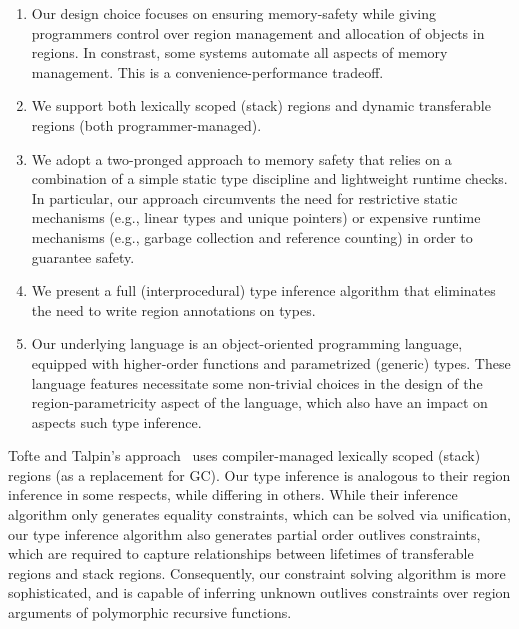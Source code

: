 \begin{enumerate}
\item 
   Our design choice focuses on ensuring memory-safety while giving programmers
   control over  region management and allocation of objects in regions.
   In constrast, some systems automate all aspects of memory management.
   This is a convenience-performance tradeoff.

\item We support both lexically scoped (stack) regions and dynamic transferable
regions (both programmer-managed).

\item We adopt a two-pronged approach to memory safety that relies on a
combination of a simple static type discipline and lightweight runtime
checks. In particular, our approach circumvents the need for restrictive
static mechanisms (e.g., linear types and unique pointers) or
expensive runtime mechanisms (e.g., garbage collection and reference
counting) in order to guarantee safety.

\item We present a full (interprocedural) type inference algorithm
that eliminates the need to write region annotations on types.

\item Our underlying language is an object-oriented programming language,
equipped with higher-order functions and parametrized (generic) types.
These language features necessitate some non-trivial choices in the design
of the region-parametricity aspect of the language, which also have an
impact on aspects such type inference.

\end{enumerate}

Tofte and Talpin's approach~\cite{tofte97} uses compiler-managed lexically
scoped (stack) regions (as a replacement for GC).
Our type inference is analogous to their region inference in some respects,
while differing in others. While their inference algorithm only generates equality constraints, which
can be solved via unification, our type inference algorithm also
generates partial order outlives constraints, which are required to
capture relationships between lifetimes of transferable regions
and stack regions. Consequently, our constraint solving algorithm is
more sophisticated, and is capable of inferring unknown outlives
constraints over region arguments of polymorphic recursive functions.

